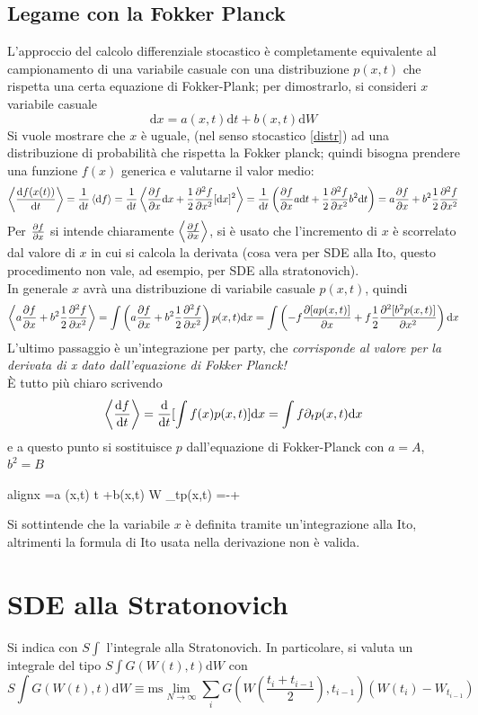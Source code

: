 \documentclass[a4paper,12pt]{article}
\newcommand{\boxedeq}[2]{\begin{empheq}[box={\fboxsep=6pt\fbox}]{align}\label{#1}#2\end{empheq}}
\theoremstyle{plain}
\theoremstyle{definition}
\newcommand{\ifandonlyif}{\Longleftrightarrow}
\newcommand{\f}[2]{\frac{#1}{#2}}
\newcommand{\ave}[1]{\left\langle#1\right\rangle }
\newcommand{\tdv}{\partial_t}
\renewcommand{\d}{\text{d}}
\newcommand{\sint}{{S}\int}
\newcommand{\ra}{\rightarrow}
\theoremstyle{remark}
\begin{document}
\subsection{Legame con la Fokker Planck}
L'approccio del calcolo differenziale stocastico è completamente equivalente al campionamento di una variabile casuale con una distribuzione $p(x,t)$ che rispetta una certa equazione di Fokker-Plank; per dimostrarlo, si consideri $x$ variabile casuale
\[\d x =a (x,t) \d t +b(x,t) \d W		\]
Si vuole mostrare che $x$ è uguale, (nel senso stocastico \ref{distr}) ad una distribuzione di probabilità che rispetta la Fokker planck; quindi bisogna prendere una funzione $f(x)$ generica e valutarne il valor medio:
\[\ave{\dv{f(x(t))}{t}}=\f{1}{\d t} \ave{\d f}=\f{1}{\d t} \ave{\pdv{f}{x} \d x+\f{1}{2}\pdv[2]{f}{x} [\d x		]^2}			={\f{1}{\d t}} \left({\pdv{f}{x} a\d t+\f{1}{2}\pdv[2]{f}{x}	b^2 \d t	}		\right)=a\pdv{f}{x} + b^2\f{1}{2}\pdv[2]{f}{x}			\]
Per $\pdv{f}{x}$ si intende chiaramente $\ave{\pdv{f}{x}}$, si è usato che l'incremento di $x$ è scorrelato dal valore di $x$ in cui si calcola la derivata (cosa vera per SDE alla Ito, questo procedimento non vale, ad esempio, per SDE alla stratonovich).\\ In generale $x$ avrà una distribuzione di variabile casuale $p(x,t)$, quindi
\[\ave{a\pdv{f}{x} + b^2\f{1}{2}\pdv[2]{f}{x}}=\int 	\left(a\pdv{f}{x} + b^2\f{1}{2}\pdv[2]{f}{x}	\right)p(x,t)	\d x=\int	\left(-f\pdv{[a p(x,t)]}{x} + f\f{1}{2}\pdv[2]{[b^2 p(x,t)]}{x}		\right)\d x	\]
L'ultimo passaggio è un'integrazione per party, che \emph{corrisponde al valore per la derivata di x dato dall'equazione di Fokker Planck!}
\\È tutto più chiaro scrivendo
\[\ave{\dv{f}{t}}=\dv{t}[\int f(x) p(x,t)		]\d x	=	\int f \tdv p(x,t)		\d x	\]
e a questo punto si sostituisce $p$ dall'equazione di Fokker-Planck con $a=A$, $b^2=B$
\boxedeq{ITO-FP}{\d x =a (x,t) \d t +b(x,t) \d W	\ifandonlyif 	\tdv p(x,t)	=-\pdv{a(x,t)p}{t}+\f{1}{2}\pdv[2]{b(x,t)p}{x}
}
Si sottintende che la variabile $x$ è definita tramite un'integrazione alla Ito, altrimenti la formula di Ito usata nella derivazione non è valida.


\section{SDE alla Stratonovich}
Si indica con $\sint$ l'integrale alla Stratonovich.
In particolare, si valuta un integrale del tipo $\sint G(W(t),t) \d W$ con \[\sint G(W(t),t) \d W\equiv \text{ms}\lim_{N\ra \infty}\sum_i G(W(\f{t_i+t_{i-1}}{2}),t_{i-1})(W(t_i)-W_{t_{i-1}})		\]
\end{document}
